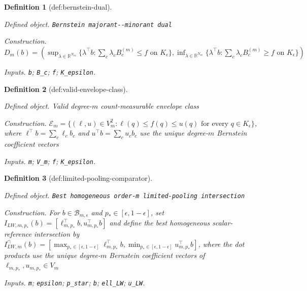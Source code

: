 \documentclass{article}
\newtheorem{definition}{Definition}
\begin{document}
\begin{definition}[def:bernstein-dual]\label{def:bernstein-dual}
\par\smallskip\noindent\emph{Defined object.} \texttt{Bernstein majorant-\allowbreak{}-\allowbreak{}minorant dual}
\par\smallskip\noindent\emph{Construction.} \(D_m(b)=(\sup_{\lambda\in\mathbb R^{N_m}}\{\lambda^\top b:\sum_c\lambda_cB_c^{(m)}\le f\text{ on }K_{\epsilon}\},\inf_{\lambda\in\mathbb R^{N_m}}\{\lambda^\top b:\sum_c\lambda_cB_c^{(m)}\ge f\text{ on }K_{\epsilon}\})\)
\par\smallskip\noindent\emph{Inputs.} \texttt{b}; \texttt{B\_\allowbreak{}c}; \texttt{f}; \texttt{K\_\allowbreak{}epsilon}.
\end{definition}

\begin{definition}[def:valid-envelope-class]\label{def:valid-envelope-class}
\par\smallskip\noindent\emph{Defined object.} Valid degree-\(m\) count-measurable envelope class
\par\smallskip\noindent\emph{Construction.} \(\mathcal E_m=\{(\ell,u)\in V_m^2:\ell(q)\le f(q)\le u(q)\text{ for every }q\in K_{\epsilon}\}\), where \(\ell^\top b=\sum_c\ell_cb_c\) and \(u^\top b=\sum_cu_cb_c\) use the unique degree-\(m\) Bernstein coefficient vectors
\par\smallskip\noindent\emph{Inputs.} \texttt{m}; \texttt{V\_\allowbreak{}m}; \texttt{f}; \texttt{K\_\allowbreak{}epsilon}.
\end{definition}

\begin{definition}[def:limited-pooling-comparator]\label{def:limited-pooling-comparator}
\par\smallskip\noindent\emph{Defined object.} \texttt{Best homogeneous order-\allowbreak{}m limited-\allowbreak{}pooling intersection}
\par\smallskip\noindent\emph{Construction.} For \(b\in\mathcal B_{m,\epsilon}\) and \(p_*\in[\epsilon,1-\epsilon]\), set \(I_{LW,m,p_*}(b)=[\ell_{m,p_*}^{\top}b,u_{m,p_*}^{\top}b]\) and define the best homogeneous scalar-reference intersection by \(I_{LW,m}^{\cap}(b)=[\max_{p_*\in[\epsilon,1-\epsilon]}\ell_{m,p_*}^{\top}b,\min_{p_*\in[\epsilon,1-\epsilon]}u_{m,p_*}^{\top}b]\), where the dot products use the unique degree-\(m\) Bernstein coefficient vectors of \(\ell_{m,p_*},u_{m,p_*}\in V_m\)
\par\smallskip\noindent\emph{Inputs.} \texttt{m}; \texttt{epsilon}; \texttt{p\_\allowbreak{}star}; \texttt{b}; \texttt{ell\_\allowbreak{}LW}; \texttt{u\_\allowbreak{}LW}.
\end{definition}
\end{document}

